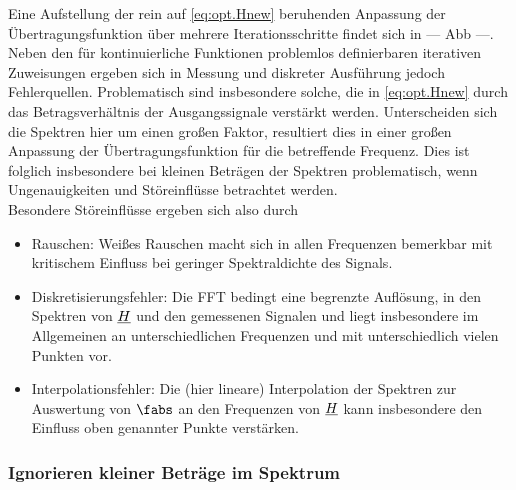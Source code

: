 \documentclass[../Report.tex]{subfiles}
\begin{document}
Eine Aufstellung der rein auf \eqref{eq:opt.Hnew} beruhenden Anpassung der Übertragungsfunktion über mehrere Iterationsschritte findet sich in --- Abb ---. 
Neben den für kontinuierliche Funktionen problemlos definierbaren iterativen Zuweisungen ergeben sich in Messung und diskreter Ausführung jedoch Fehlerquellen. Problematisch sind insbesondere solche, die in \eqref{eq:opt.Hnew} durch das Betragsverhältnis der Ausgangssignale verstärkt werden. 
Unterscheiden sich die Spektren hier um einen großen Faktor, resultiert dies in einer großen Anpassung der Übertragungsfunktion für die betreffende Frequenz. Dies ist folglich insbesondere bei kleinen Beträgen der Spektren problematisch, wenn Ungenauigkeiten und Störeinflüsse betrachtet werden. 
\\
Besondere Störeinflüsse ergeben sich also durch
\begin{itemize}
	\item Rauschen: Weißes Rauschen macht sich in allen Frequenzen bemerkbar mit kritischem Einfluss bei geringer Spektraldichte des Signals.
	
	\item Diskretisierungsfehler: Die FFT bedingt eine begrenzte Auflösung, in den Spektren von $\underline{H}$ und den gemessenen Signalen und liegt insbesondere im Allgemeinen an unterschiedlichen Frequenzen und mit unterschiedlich vielen Punkten vor.
	
	\item Interpolationsfehler: Die (hier lineare) Interpolation der Spektren zur Auswertung von $\fabs$ an den Frequenzen von $\underline{H}$ kann insbesondere den Einfluss oben genannter Punkte verstärken.
\end{itemize}

\subsubsection*{Ignorieren kleiner Beträge im Spektrum}
\label{subsubsec:opt.H.prom}
\end{document}
